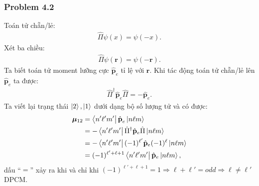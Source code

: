 \documentclass{report}
\renewcommand{\l}{\ell}
\begin{document}
\subsubsection*{Problem 4.2}
Toán tử chẵn/lẻ:
\begin{align*}
	\hat{\Pi} \psi(x) = \psi(-x).
\end{align*}
Xét ba chiều:
\begin{align*}
	\hat{\Pi} \psi(\mathbf{r}) = \psi(-\mathbf{r}).
\end{align*}
Ta biết toán tử moment lưỡng cực $\hat{\textbf{p}}_e$ tỉ lệ với $\mathbf{r}$. Khi tác động toán tử chẵn/lẻ lên $\hat{\textbf{p}}_e$ ta được:
\begin{align*}
	\hat{\Pi}^{\dagger} \hat{\textbf{p}}_e \hat{\Pi} = - \hat{\textbf{p}}_e.
\end{align*}
Ta viết lại trạng thái $\ket{2},\ket{1}$ dưới dạng bộ số lượng tử và có được:
\begin{align*}
	\boldsymbol{\mu}_{12}
	 & = \bra{n'\l'm'} \hat{\textbf{p}}_e \ket{n\l m}                                   \\
	 & =  - \bra{n'\l'm'}  \hat{\Pi}^{\dagger} \hat{\mathbf{p}}_e \hat{\Pi} \ket{n\l m} \\
	 & =  - \bra{n'\l'm'}  (-1)^{\l'} \hat{\mathbf{p}}_e (-1)^{\l} \ket{n\l m}          \\
	 & =(-1)^{\l' + \l + 1} \bra{n'\l'm'}   \hat{\mathbf{p}}_e \ket{n\l m},
\end{align*}
dấu ``$=$'' xảy ra khi và chỉ khi $ (-1)^{\l' + \l + 1} = 1 \Rightarrow \l + \l' = odd \Rightarrow \l \neq \l'$ DPCM.
\end{document}
